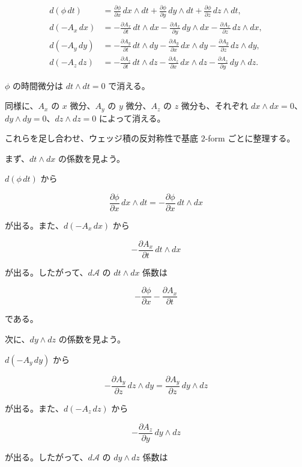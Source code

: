 \documentclass[a4paper,12pt,openany]{book}
\begin{document}
\[
\begin{aligned}
d(\phi\,dt)
&=
\frac{\partial\phi}{\partial x}\,dx\wedge dt
+
\frac{\partial\phi}{\partial y}\,dy\wedge dt
+
\frac{\partial\phi}{\partial z}\,dz\wedge dt,
\\[0.5em]
d(-A_x\,dx)
&=
-\frac{\partial A_x}{\partial t}\,dt\wedge dx
-
\frac{\partial A_x}{\partial y}\,dy\wedge dx
-
\frac{\partial A_x}{\partial z}\,dz\wedge dx,
\\[0.5em]
d(-A_y\,dy)
&=
-\frac{\partial A_y}{\partial t}\,dt\wedge dy
-
\frac{\partial A_y}{\partial x}\,dx\wedge dy
-
\frac{\partial A_y}{\partial z}\,dz\wedge dy,
\\[0.5em]
d(-A_z\,dz)
&=
-\frac{\partial A_z}{\partial t}\,dt\wedge dz
-
\frac{\partial A_z}{\partial x}\,dx\wedge dz
-
\frac{\partial A_z}{\partial y}\,dy\wedge dz.
\end{aligned}
\]

\(\phi\) の時間微分は \(dt\wedge dt=0\) で消える。

同様に、\(A_x\) の \(x\) 微分、\(A_y\) の \(y\) 微分、\(A_z\) の \(z\)
微分も、それぞれ \(dx\wedge dx=0\)、\(dy\wedge dy=0\)、\(dz\wedge dz=0\)
によって消える。

これらを足し合わせ、ウェッジ積の反対称性で基底 \(2\)-form
ごとに整理する。

まず、\(dt\wedge dx\) の係数を見よう。

\(d(\phi\,dt)\) から

\[
\frac{\partial\phi}{\partial x}\,dx\wedge dt
=
-\frac{\partial\phi}{\partial x}\,dt\wedge dx
\]

が出る。また、\(d(-A_x\,dx)\) から

\[
-\frac{\partial A_x}{\partial t}\,dt\wedge dx
\]

が出る。したがって、\(d\mathcal{A}\) の \(dt\wedge dx\) 係数は

\[
-\frac{\partial\phi}{\partial x}
-
\frac{\partial A_x}{\partial t}
\]

である。

次に、\(dy\wedge dz\) の係数を見よう。

\(d(-A_y\,dy)\) から

\[
-\frac{\partial A_y}{\partial z}\,dz\wedge dy
=
\frac{\partial A_y}{\partial z}\,dy\wedge dz
\]

が出る。また、\(d(-A_z\,dz)\) から

\[
-\frac{\partial A_z}{\partial y}\,dy\wedge dz
\]

が出る。したがって、\(d\mathcal{A}\) の \(dy\wedge dz\) 係数は
\end{document}

